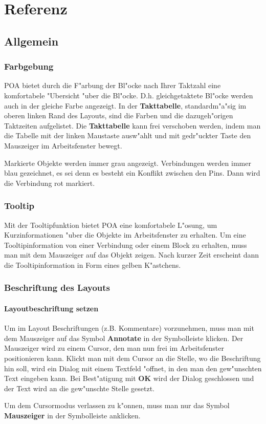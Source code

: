 \documentclass[a4paper,titlepage,12pt,ngerman]{scrbook}
\begin{document}
\chapter{Referenz}

\section{Allgemein}
\subsection{Farbgebung}
POA bietet durch die F"arbung der Bl"ocke nach Ihrer Taktzahl eine komfortabele "Ubersicht "uber die Bl"ocke. D.h. gleichgetaktete Bl"ocke werden auch in der gleiche Farbe angezeigt.\newline
In der {\bf Takttabelle}, standardm"a"sig im oberen linken Rand des Layouts, sind die Farben und die dazugeh"origen Taktzeiten aufgelistet. Die {\bf Takttabelle} kann frei verschoben werden, indem man die Tabelle mit der linken Maustaste ausw"ahlt und mit gedr"uckter Taste den Mauszeiger im Arbeitsfenster bewegt.\par
Markierte Objekte werden immer grau angezeigt.\newline
Verbindungen werden immer blau gezeichnet, es sei denn es besteht ein Konflikt zwischen den Pins. Dann wird die Verbindung rot markiert.


\subsection{Tooltip}
Mit der Tooltipfunktion bietet POA eine komfortabele L"osung, um Kurzinformationen "uber die Objekte im Arbeitsfenster zu erhalten. Um eine Tooltipinformation von einer Verbindung oder einem Block zu erhalten, muss man mit dem Mauszeiger auf das Objekt zeigen. Nach kurzer Zeit erscheint dann die Tooltipinformation in Form eines gelben K"astchens.

\subsection{Beschriftung des Layouts}
\subsubsection{Layoutbeschriftung setzen}
Um im Layout Beschriftungen (z.B. Kommentare) vorzunehmen, muss man mit dem Mauszeiger auf das Symbol {\bf Annotate} in der Symbolleiste klicken.%
Der Mauszeiger wird zu einem Cursor, den man nun frei im Arbeitsfenster positionieren kann. Klickt man mit dem Cursor an die Stelle, wo die Beschriftung hin soll, wird ein Dialog mit einem Textfeld "offnet, in den man den gew"unschten Text eingeben kann. Bei Best"atigung mit {\bf OK} wird der Dialog geschlossen und der Text wird an die gew"unschte Stelle gesetzt.\par
Um dem Cursormodus verlassen zu k"onnen, muss man nur das Symbol {\bf Mauszeiger} in der Symbolleiste anklicken.
\end{document}
